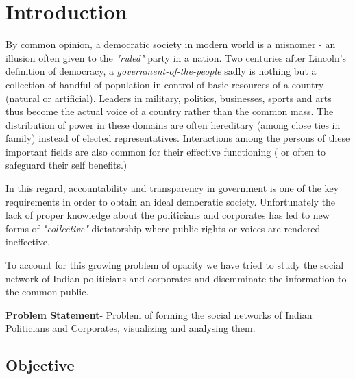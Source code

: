 \chapter{Introduction}


By common opinion, a democratic society in modern world is a misnomer - an illusion often given to the \emph{ "ruled" } party in a nation. Two centuries after Lincoln's definition of democracy, a \emph{ government-of-the-people  }sadly is nothing but a collection of handful of population in control of basic resources of a country (natural or artificial). Leaders in military, politics, businesses, sports and arts thus become the actual voice of a country rather than the common mass. The distribution of power in these domains are often hereditary (among close ties in family) instead of elected representatives. Interactions among the persons of these important fields are also common for their effective functioning ( or often to safeguard their self benefits.)

In this regard, accountability and transparency in government is one of the key requirements in order to obtain an ideal democratic society. Unfortunately the lack of proper knowledge about the politicians and corporates has led to new forms of \emph{ "collective" } dictatorship where public rights or voices are rendered ineffective.

To account for this growing problem of opacity we have tried to study the social network of Indian politicians and corporates and disemminate the information to the common public.

\textbf{Problem Statement}-
Problem of forming the social networks of Indian Politicians and Corporates, visualizing  and analysing them.

\section{Objective}

